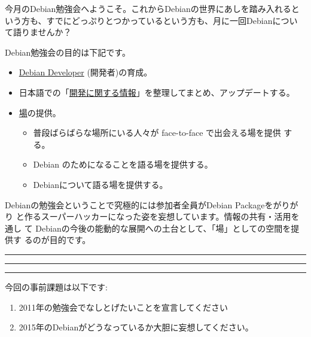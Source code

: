 \documentclass[mingoth,a4paper]{jsarticle}
\begin{document}
\begin{multicols}{2}
 

 今月のDebian勉強会へようこそ。これからDebianの世界にあしを踏み入れると
 いう方も、すでにどっぷりとつかっているという方も、月に一回Debianについ
 て語りませんか？

 Debian勉強会の目的は下記です。

 \begin{itemize}
 \item \underline{Debian Developer} (開発者)の育成。
 \item 日本語での「\underline{開発に関する情報}」を整理してまとめ、アップデートする。
 \item \underline{場}の提供。
 \begin{itemize}
  \item 普段ばらばらな場所にいる人々が face-to-face で出会える場を提供
	する。
  \item Debian のためになることを語る場を提供する。
  \item Debianについて語る場を提供する。
 \end{itemize}
 \end{itemize}		

 Debianの勉強会ということで究極的には参加者全員がDebian Packageをがりがり
 と作るスーパーハッカーになった姿を妄想しています。情報の共有・活用を通し
 て Debianの今後の能動的な展開への土台として、「場」としての空間を提供す
 るのが目的です。

\end{multicols}

\newpage

\begin{minipage}[b]{0.2\hsize}
 \colorbox{titleback}{}
\end{minipage}
\begin{minipage}[b]{0.8\hsize}
\hrule
\vspace{2mm}
\hrule
\begin{multicols}{2}
\tableofcontents
\end{multicols}
\vspace{2mm}
\hrule
\end{minipage}


今回の事前課題は以下です:
\begin{enumerate}
 \item 2011年の勉強会でなしとげたいことを宣言してください 
 \item 2015年のDebianがどうなっているか大胆に妄想してください。
\end{enumerate}
\end{document}
